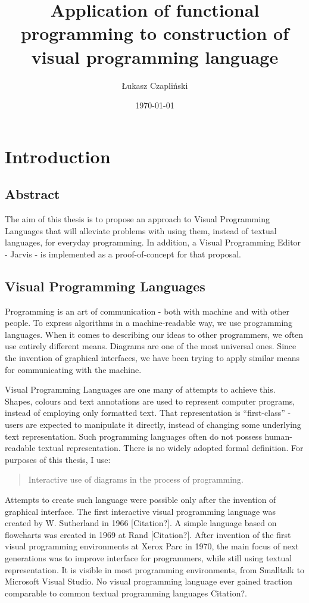 \documentclass[11pt]{scrartcl}
\title{Application of functional programming to construction of visual programming language}
\author{Łukasz Czapliński}
\date{\today}
\begin{document}
\maketitle

\section{Introduction}
\subsection{Abstract}
The aim of this thesis is to propose an approach to  Visual Programming Languages that will alleviate problems with using them, instead of textual languages, for everyday programming. In addition, a Visual Programming Editor - Jarvis - is implemented as a proof-of-concept for that proposal.

\subsection{Visual Programming Languages}
Programming is an art of communication - both with machine and with other people.
To express algorithms in a machine-readable way, we use programming languages. When it comes to describing our ideas to other programmers, we often use entirely different means. Diagrams are one of the most universal ones. Since the invention of graphical interfaces, we have been trying to apply similar means for communicating with the machine.

Visual Programming Languages are one many of attempts to achieve this. Shapes, colours and text annotations are used to represent computer programs, instead of employing only formatted text. That representation is “first-class” - users are expected to manipulate it directly, instead of changing some underlying text representation. Such programming languages often do not possess human-readable textual representation. There is no widely adopted formal definition.  For purposes of this thesis, I use:
\blockquote[{\cite[Chapter 2]{nickerson1995visual}}]{Interactive use of diagrams in the process of programming.}

Attempts to create such language were possible only after the invention of graphical interface. The first interactive visual programming language was created by W. Sutherland in 1966 [Citation?]. A simple language based on flowcharts was created in 1969 at Rand [Citation?]. After invention of the first visual programming environments at Xerox Parc in 1970, the main focus of next generations was to improve interface for programmers, while still using textual representation. It is visible in most programming environments, from Smalltalk to Microsoft Visual Studio. No visual programming language ever gained traction comparable to common textual programming languages {Citation?}. 
\end{document}
